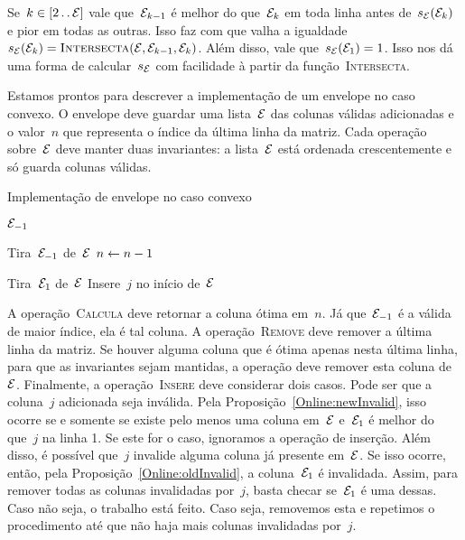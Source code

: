 Se~$k \in [2 \,.\,.\, \mathcal{E}]$ vale que~$\mathcal{E}_{k-1}$ é melhor do que~$\mathcal{E}_k$ em toda linha antes de~$s_{\mathcal{E}}(\mathcal{E}_k)$ e pior em todas as outras. Isso faz com que valha a igualdade~$s_{\mathcal{E}}(\mathcal{E}_k) = \textsc{Intersecta}(\mathcal{E},\mathcal{E}_{k-1},\mathcal{E}_k)$. Além disso, vale que~$s_{\mathcal{E}}(\mathcal{E}_1) = 1$. Isso nos dá uma forma de calcular~$s_{\mathcal{E}}$ com facilidade à partir da função~\textsc{Intersecta}.

Estamos prontos para descrever a implementação de um envelope no caso convexo. O envelope deve guardar uma lista~$\mathcal{E}$ das colunas válidas adicionadas e o valor~$n$ que representa o índice da última linha da matriz. Cada operação sobre~$\mathcal{E}$ deve manter duas invariantes: a lista~$\mathcal{E}$ está ordenada crescentemente e só guarda colunas válidas.

\begin{algorithm}[h]
\caption{Implementação de envelope no caso convexo}
\label{Online:Convexo:algo}
\begin{algorithmic}[1]
    \State \Return $\mathcal{E}_{-1}$
\EndFunction

     \label{Online:Convexo:algo:RemTira}
        \State Tira~$\mathcal{E}_{-1}$ de~$\mathcal{E}$
    \EndIf
    \State $n \leftarrow n-1$
\EndFunction

     \label{Online:Convexo:algo:InsTira}
            \State Tira~$\mathcal{E}_{1}$ de~$\mathcal{E}$
        \EndWhile
        \State Insere~$j$ no início de~$\mathcal{E}$
    \EndIf
\EndFunction
\end{algorithmic}
\end{algorithm}

A operação~\textsc{Calcula} deve retornar a coluna ótima em~$n$. Já que~$\mathcal{E}_{-1}$ é a válida de maior índice, ela é tal coluna. A operação~\textsc{Remove} deve remover a última linha da matriz. Se houver alguma coluna que é ótima apenas nesta última linha, para que as invariantes sejam mantidas, a operação deve remover esta coluna de~$\mathcal{E}$. Finalmente, a operação~\textsc{Insere} deve considerar dois casos. Pode ser que a coluna~$j$ adicionada seja inválida. Pela Proposição~\ref{Online:newInvalid}, isso ocorre se e somente se existe pelo menos uma coluna em~$\mathcal{E}$ e~$\mathcal{E}_1$ é melhor do que~$j$ na linha 1. Se este for o caso, ignoramos a operação de inserção. Além disso, é possível que~$j$ invalide alguma coluna já presente em~$\mathcal{E}$. Se isso ocorre, então, pela Proposição~\ref{Online:oldInvalid}, a coluna~$\mathcal{E}_1$ é invalidada. Assim, para remover todas as colunas invalidadas por~$j$, basta checar se~$\mathcal{E}_1$ é uma dessas. Caso não seja, o trabalho está feito. Caso seja, removemos esta e repetimos o procedimento até que não haja mais colunas invalidadas por~$j$.

